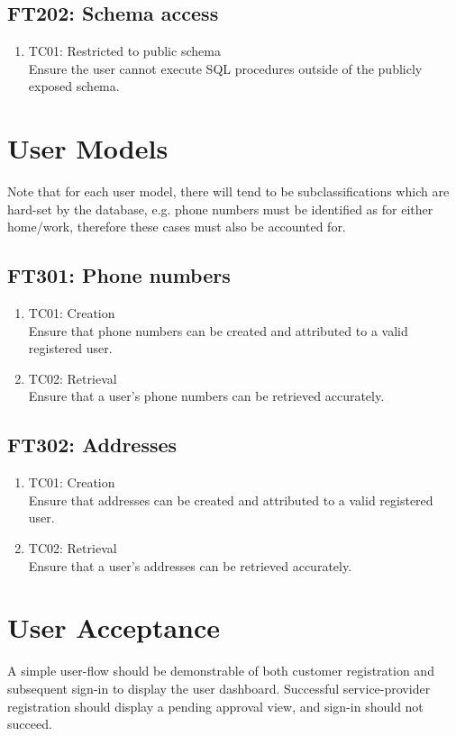 \documentclass[journal]{IEEEtran}
\begin{document}
	\subsection{\textsc{FT202:} Schema access}
	\begin{enumerate}
		\item \textsc{TC01:} Restricted to public schema\\
		Ensure the user cannot execute SQL procedures outside of the publicly exposed schema.
	\end{enumerate}
	
	\section{User Models}
	Note that for each user model, there will tend to be subclassifications which are hard-set by the database, e.g. phone numbers must be identified as for either home/work, therefore these cases must also be accounted for.
	
	\subsection{\textsc{FT301:} Phone numbers}
	\begin{enumerate}
		\item \textsc{TC01:} Creation\\
		Ensure that phone numbers can be created and attributed to a valid registered user.
		\item \textsc{TC02:} Retrieval\\
		Ensure that a user's phone numbers can be retrieved accurately.
	\end{enumerate}
	
	\subsection{\textsc{FT302:} Addresses}
	\begin{enumerate}
		\item \textsc{TC01:} Creation\\
		Ensure that addresses can be created and attributed to a valid registered user.
		\item \textsc{TC02:} Retrieval\\
		Ensure that a user's addresses can be retrieved accurately.
	\end{enumerate}
	
	\section{User Acceptance}
	A simple user-flow should be demonstrable of both customer registration and subsequent sign-in to display the user dashboard. Successful service-provider registration should display a pending approval view, and sign-in should not succeed.
\end{document}
